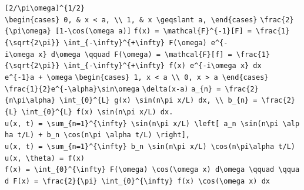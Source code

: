 \documentclass[
  ukrainian,
]{article}
\begin{document}
\texttt{{[}2/\textbackslash{}pi\textbackslash{}omega{]}\^{}\{1/2\}}
\texttt{\textbackslash{}begin\{cases\}\ 0,\ \&\ x\ \textless{}\ a,\ \textbackslash{}\textbackslash{}\ 1,\ \&\ x\ \textbackslash{}geqslant\ a,\ \textbackslash{}end\{cases\}}
\texttt{\textbackslash{}frac\{2\}\{\textbackslash{}pi\textbackslash{}omega\}\ {[}1-\textbackslash{}cos(\textbackslash{}omega\ a){]}}
\texttt{f(x)\ =\ \textbackslash{}mathcal\{F\}\^{}\{-1\}{[}F{]}\ =\ \textbackslash{}frac\{1\}\{\textbackslash{}sqrt\{2\textbackslash{}pi\}\}\ \textbackslash{}int\_\{-\textbackslash{}infty\}\^{}\{+\textbackslash{}infty\}\ F(\textbackslash{}omega)\ e\^{}\{-i\textbackslash{}omega\ x\}\ d\textbackslash{}omega\ \textbackslash{}qquad\ F(\textbackslash{}omega)\ =\ \textbackslash{}mathcal\{F\}{[}f{]}\ =\ \textbackslash{}frac\{1\}\{\textbackslash{}sqrt\{2\textbackslash{}pi\}\}\ \textbackslash{}int\_\{-\textbackslash{}infty\}\^{}\{+\textbackslash{}infty\}\ f(x)\ e\^{}\{-i\textbackslash{}omega\ x\}\ dx}
\texttt{e\^{}\{-1\}a\ +\ \textbackslash{}omega}
\texttt{\textbackslash{}begin\{cases\}\ 1,\ \textbar{}x\textbar{}\ \textless{}\ a\ \textbackslash{}\textbackslash{}\ 0,\ \textbar{}x\textbar{}\ \textgreater{}\ a\ \textbackslash{}end\{cases\}}
\texttt{\textbackslash{}frac\{1\}\{2\}e\^{}\{-\textbackslash{}alpha\}\textbackslash{}sin\textbackslash{}omega}
\texttt{\textbackslash{}delta(x-a)}
\texttt{a\_\{n\}\ =\ \textbackslash{}frac\{2\}\{n\textbackslash{}pi\textbackslash{}alpha\}\ \textbackslash{}int\_\{0\}\^{}\{L\}\ g(x)\ \textbackslash{}sin(n\textbackslash{}pi\ x/L)\ dx,\ \textbackslash{}\textbackslash{}\ b\_\{n\}\ =\ \textbackslash{}frac\{2\}\{L\}\ \textbackslash{}int\_\{0\}\^{}\{L\}\ f(x)\ \textbackslash{}sin(n\textbackslash{}pi\ x/L)\ dx.}
\texttt{u(x,\ t)\ =\ \textbackslash{}sum\_\{n=1\}\^{}\{\textbackslash{}infty\}\ \textbackslash{}sin(n\textbackslash{}pi\ x/L)\ \textbackslash{}left{[}\ a\_n\ \textbackslash{}sin(n\textbackslash{}pi\ \textbackslash{}alpha\ t/L)\ +\ b\_n\ \textbackslash{}cos(n\textbackslash{}pi\ \textbackslash{}alpha\ t/L)\ \textbackslash{}right{]},}
\texttt{u(x,\ t)\ =\ \textbackslash{}sum\_\{n=1\}\^{}\{\textbackslash{}infty\}\ b\_n\ \textbackslash{}sin(n\textbackslash{}pi\ x/L)\ \textbackslash{}cos(n\textbackslash{}pi\textbackslash{}alpha\ t/L)}
\texttt{u(x,\ \textbackslash{}theta)\ =\ f(x)}
\texttt{f(x)\ =\ \textbackslash{}int\_\{0\}\^{}\{\textbackslash{}infty\}\ F(\textbackslash{}omega)\ \textbackslash{}cos(\textbackslash{}omega\ x)\ d\textbackslash{}omega\ \textbackslash{}qquad\ \textbackslash{}qquad\ F(x)\ =\ \textbackslash{}frac\{2\}\{\textbackslash{}pi\}\ \textbackslash{}int\_\{0\}\^{}\{\textbackslash{}infty\}\ f(x)\ \textbackslash{}cos(\textbackslash{}omega\ x)\ dx}
\end{document}
